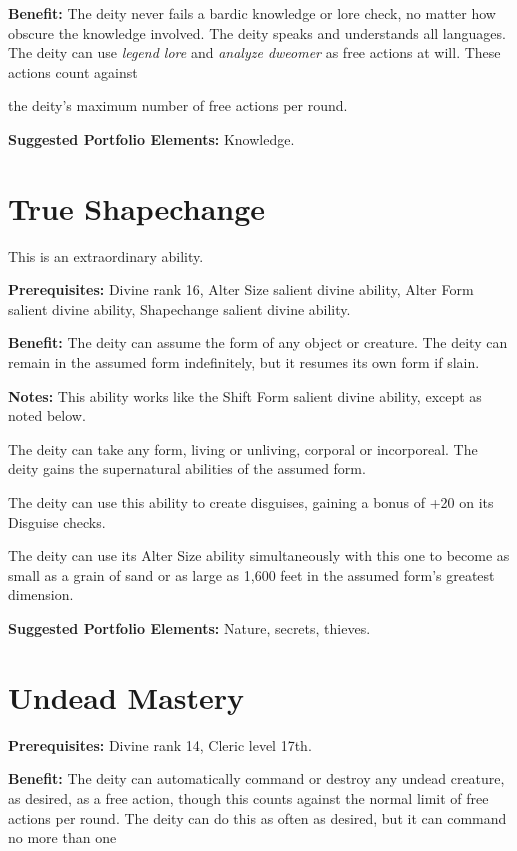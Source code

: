 \documentclass{article}
\begin{document}
\textbf{Benefit:} The deity never fails a bardic knowledge or lore check, no matter 
how obscure the knowledge involved. The deity speaks and understands all languages. 
The deity can use \textit{legend lore }and \textit{analyze dweomer }as free actions 
at will. These actions count against

the deity's maximum number of free actions per round.

\textbf{Suggested Portfolio Elements:} Knowledge.

\vspace{12pt}
\section*{True Shapechange}

This is an extraordinary ability.

\textbf{Prerequisites:} Divine rank 16, Alter Size salient divine ability, Alter 
Form salient divine ability, Shapechange salient divine ability.

\textbf{Benefit:} The deity can assume the form of any object or creature. The 
deity can remain in the assumed form indefinitely, but it resumes its own form 
if slain.

\textbf{Notes:} This ability works like the Shift Form salient divine ability, 
except as noted below.

The deity can take any form, living or unliving, corporal or incorporeal. The deity 
gains the supernatural abilities of the assumed form.

The deity can use this ability to create disguises, gaining a bonus of +20 on its 
Disguise checks.

The deity can use its Alter Size ability simultaneously with this one to become 
as small as a grain of sand or as large as 1,600 feet in the assumed form's greatest 
dimension.

\textbf{Suggested Portfolio Elements:} Nature, secrets, thieves.

\vspace{12pt}
\section*{Undead Mastery}

\textbf{Prerequisites:} Divine rank 14, Cleric level 17th.

\textbf{Benefit:} The deity can automatically command or destroy any undead creature, 
as desired, as a free action, though this counts against the normal limit of free 
actions per round. The deity can do this as often as desired, but it can command 
no more than one
\end{document}
